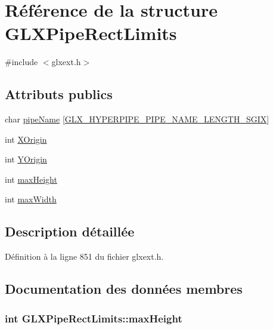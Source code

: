 \hypertarget{struct_g_l_x_pipe_rect_limits}{\section{Référence de la structure G\-L\-X\-Pipe\-Rect\-Limits}
\label{struct_g_l_x_pipe_rect_limits}
}


{\ttfamily \#include $<$glxext.\-h$>$}

\subsection*{Attributs publics}
\begin{DoxyCompactItemize}
\item 
char \hyperlink{struct_g_l_x_pipe_rect_limits_ae78b4b6656101bc841946733a5b6e5ce}{pipe\-Name} \mbox{[}\hyperlink{glxext_8h_ae1c8261c0861010d8003a31d07e26005}{G\-L\-X\-\_\-\-H\-Y\-P\-E\-R\-P\-I\-P\-E\-\_\-\-P\-I\-P\-E\-\_\-\-N\-A\-M\-E\-\_\-\-L\-E\-N\-G\-T\-H\-\_\-\-S\-G\-I\-X}\mbox{]}
\item 
int \hyperlink{struct_g_l_x_pipe_rect_limits_a3e5a965059d9f5d2ca42acd35af5bb9b}{X\-Origin}
\item 
int \hyperlink{struct_g_l_x_pipe_rect_limits_a50e06bcf0dae95854be7d93a515199e9}{Y\-Origin}
\item 
int \hyperlink{struct_g_l_x_pipe_rect_limits_a27572e499c0d3280031c2ad8e387c0c1}{max\-Height}
\item 
int \hyperlink{struct_g_l_x_pipe_rect_limits_a8662c7a712b30620e25fc994adf337a1}{max\-Width}
\end{DoxyCompactItemize}


\subsection{Description détaillée}


Définition à la ligne 851 du fichier glxext.\-h.



\subsection{Documentation des données membres}
\hypertarget{struct_g_l_x_pipe_rect_limits_a27572e499c0d3280031c2ad8e387c0c1}{
\subsubsection[{max\-Height}]{\setlength{\rightskip}{0pt plus 5cm}int G\-L\-X\-Pipe\-Rect\-Limits\-::max\-Height}}\label{struct_g_l_x_pipe_rect_limits_a27572e499c0d3280031c2ad8e387c0c1}


